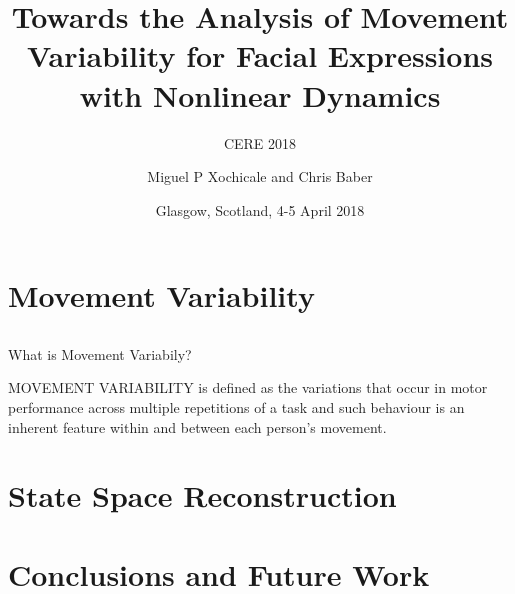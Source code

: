 \documentclass[compress]{beamer}
\title{Towards the Analysis of Movement Variability for Facial Expressions  \\ 
	with Nonlinear Dynamics}
\subtitle{CERE 2018}
\date{Glasgow, Scotland, 4-5 April 2018}
\author{Miguel P Xochicale and Chris Baber}
\institute{School of Engineering \\{\bf University of Birmingham}}
\begin{document}

\maketitle


%

%
\section{Movement Variability}


\subsection{}
{


\begin{frame}{What is Movement Variabily?}

\LARGE
MOVEMENT VARIABILITY is defined as the variations that occur in motor
performance across multiple repetitions of a task and such behaviour is 
an inherent feature within and between each person's movement.
\end{frame}
}



\section{State Space Reconstruction}




\section{Conclusions and Future Work}
\end{document}
